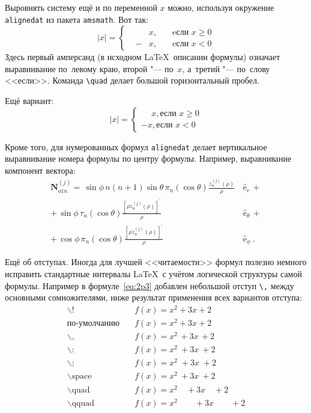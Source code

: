 Выровнять систему ещё и по переменной \( x \) можно, используя окружение
\verb|alignedat| из пакета \verb|amsmath|. Вот так:
\[
    |x| = \left\{
    \begin{alignedat}{2}
        &&x, \quad &\text{eсли } x\geqslant 0 \\
        &-&x, \quad & \text{eсли } x<0
    \end{alignedat}
    \right.
\]
Здесь первый амперсанд (в исходном \LaTeX\ описании формулы) означает
выравнивание по~левому краю, второй "--- по~\( x \), а~третий "--- по~слову
<<если>>. Команда \verb|\quad| делает большой горизонтальный пробел.

Ещё вариант:
\[
    |x|=
    \begin{cases}
    \phantom{-}x, \text{если } x \geqslant 0 \\
    -x, \text{если } x<0
    \end{cases}
\]

Кроме того, для  нумерованных формул \verb|alignedat| делает вертикальное
выравнивание номера формулы по центру формулы. Например, выравнивание
компонент вектора:
\begin{equation}
\label{eq:2p3}
\begin{alignedat}{2}
{\mathbf{N}}_{o1n}^{(j)} = \,{\sin} \phi\,n\!\left(n+1\right)
         {\sin}\theta\,
         \pi_n\!\left({\cos} \theta\right)
         \frac{
               z_n^{(j)}\!\left( \rho \right)
              }{\rho}\,
           &{\boldsymbol{\hat{\mathrm e}}}_{r}\,+   \\
+\,
{\sin} \phi\,
         \tau_n\!\left({\cos} \theta\right)
         \frac{
            \left[\rho z_n^{(j)}\!\left( \rho \right)\right]^{\prime}
              }{\rho}\,
            &{\boldsymbol{\hat{\mathrm e}}}_{\theta}\,+   \\
+\,
{\cos} \phi\,
         \pi_n\!\left({\cos} \theta\right)
         \frac{
            \left[\rho z_n^{(j)}\!\left( \rho \right)\right]^{\prime}
              }{\rho}\,
            &{\boldsymbol{\hat{\mathrm e}}}_{\phi}\:.
\end{alignedat}
\end{equation}

Ещё об отступах. Иногда для лучшей <<читаемости>> формул полезно
немного исправить стандартные интервалы \LaTeX\ с учётом логической
структуры самой формулы. Например в формуле~\cref{eq:2p3} добавлен
небольшой отступ \verb+\,+ между основными сомножителями, ниже
результат применения всех вариантов отступа:
\begin{align*}
\backslash! &\quad f(x) = x^2\! +3x\! +2 \\
  \mbox{по-умолчанию} &\quad f(x) = x^2+3x+2 \\
\backslash, &\quad f(x) = x^2\, +3x\, +2 \\
\backslash{:} &\quad f(x) = x^2\: +3x\: +2 \\
\backslash; &\quad f(x) = x^2\; +3x\; +2 \\
\backslash \mbox{space} &\quad f(x) = x^2\ +3x\ +2 \\
\backslash \mbox{quad} &\quad f(x) = x^2\quad +3x\quad +2 \\
\backslash \mbox{qquad} &\quad f(x) = x^2\qquad +3x\qquad +2
\end{align*}

